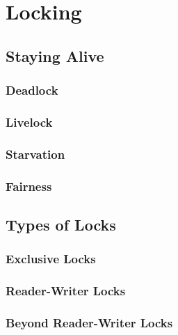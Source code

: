 
\chapter{Locking}
\label{chp:Locking}

\section{Staying Alive}
\label{sec:sync:Staying Alive}

\subsection{Deadlock}
\label{sec:sync:Deadlock}

\subsection{Livelock}
\label{sec:sync:Livelock}

\subsection{Starvation}
\label{sec:sync:Starvation}

\subsection{Fairness}
\label{sec:sync:Fairness}

\section{Types of Locks}
\label{sec:sync:Types of Locks}

\subsection{Exclusive Locks}
\label{sec:sync:Exclusive Locks}

\subsection{Reader-Writer Locks}
\label{sec:sync:Reader-Writer Locks}

\subsection{Beyond Reader-Writer Locks}
\label{sec:sync:Beyond Reader-Writer Locks}

